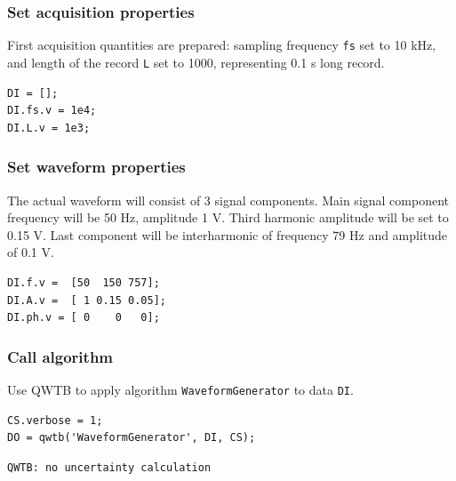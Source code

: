 \startcontents[localtoc]



{}
\subsubsection*{Set acquisition properties}



First acquisition quantities are prepared: sampling frequency \texttt{fs} set to
10 kHz, and length of the record \texttt{L} set to 1000, representing 0.1 s long record.

\begin{lstlisting}
DI = [];
DI.fs.v = 1e4;
DI.L.v = 1e3;
\end{lstlisting}


{}
\subsubsection*{Set waveform properties}



The actual waveform will consist of 3 signal components. Main signal
component frequency will be 50 Hz, amplitude 1 V. Third harmonic amplitude
will be set to 0.15 V. Last component will be interharmonic of frequency 79 Hz and amplitude of 0.1 V.

\begin{lstlisting}
DI.f.v =  [50  150 757];
DI.A.v =  [ 1 0.15 0.05];
DI.ph.v = [ 0    0   0];
\end{lstlisting}


{}
\subsubsection*{Call algorithm}



Use QWTB to apply algorithm \texttt{WaveformGenerator} to data \texttt{DI}.

\begin{lstlisting}
CS.verbose = 1;
DO = qwtb('WaveformGenerator', DI, CS);
\end{lstlisting}
\begin{lstlisting}[language={},xleftmargin=5pt,frame=none]
QWTB: no uncertainty calculation

\end{lstlisting}


